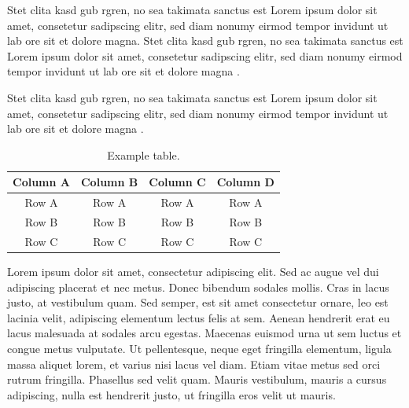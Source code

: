 \cite{TS-40561} Stet clita kasd gub rgren, no sea takimata sanctus est Lorem ipsum dolor sit amet, consetetur sadipscing elitr, sed diam nonumy eirmod tempor invidunt ut lab ore sit et dolore magna. Stet clita kasd gub rgren, no sea takimata sanctus est Lorem ipsum dolor sit amet, consetetur sadipscing elitr, sed diam nonumy eirmod tempor invidunt ut lab ore sit et dolore magna \cite{startrek,simpsondvd}. 

\citet{nelson88,moore91} Stet clita kasd gub rgren, no sea takimata sanctus est Lorem ipsum dolor sit amet, consetetur sadipscing elitr, sed diam nonumy eirmod tempor invidunt ut lab ore sit et dolore magna \citep{unesco}. 

\vspace{6pt} %
\begin{table}[!ht]
\centering
\setlength{\tabcolsep}{14pt}
\caption{Example table.}
\begin{tabular}{cccc}
\toprule\midrule
Column A & Column B & Column C & Column D \\
\midrule
Row A & Row A & Row A & Row A \\
Row B & Row B & Row B & Row B \\
Row C & Row C & Row C & Row C \\
\bottomrule
\end{tabular}
\label{table:ch4-1}
\end{table}
\vspace{-6pt} %

Lorem ipsum dolor sit amet, consectetur adipiscing elit. Sed ac augue vel dui  adipiscing placerat et nec metus. Donec bibendum sodales mollis. Cras in lacus  justo, at vestibulum quam. Sed semper, est sit amet consectetur ornare, leo est  lacinia velit, adipiscing elementum lectus felis at sem. Aenean hendrerit erat eu  lacus malesuada at sodales arcu egestas. Maecenas euismod urna ut sem luctus et  congue metus vulputate. Ut pellentesque, neque eget fringilla elementum, ligula  massa aliquet lorem, et varius nisi lacus vel diam. Etiam vitae metus sed orci  rutrum fringilla. Phasellus sed velit quam. Mauris vestibulum, mauris a cursus  adipiscing, nulla est hendrerit justo, ut fringilla eros velit ut mauris.